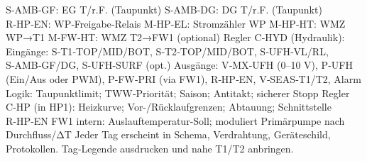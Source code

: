 \markdownRendererInterblockSeparator
{}\markdownRendererUlBeginTight
\markdownRendererUlItem S‑AMB‑GF: EG T/r.F. (Taupunkt)\markdownRendererUlItemEnd 
\markdownRendererUlItem S‑AMB‑DG: DG T/r.F. (Taupunkt)\markdownRendererUlItemEnd 
\markdownRendererUlEndTight \markdownRendererInterblockSeparator
{}
\markdownRendererSectionEnd \markdownRendererSectionBegin
{}\markdownRendererInterblockSeparator
{}\markdownRendererUlBeginTight
\markdownRendererUlItem R‑HP‑EN: WP‑Freigabe‑Relais\markdownRendererUlItemEnd 
\markdownRendererUlItem M‑HP‑EL: Stromzähler WP\markdownRendererUlItemEnd 
\markdownRendererUlItem M‑HP‑HT: WMZ WP→T1\markdownRendererUlItemEnd 
\markdownRendererUlItem M‑FW‑HT: WMZ T2→FW1 (optional)\markdownRendererUlItemEnd 
\markdownRendererUlEndTight \markdownRendererInterblockSeparator
{}
\markdownRendererSectionEnd \markdownRendererSectionBegin
{}\markdownRendererInterblockSeparator
{}\markdownRendererUlBeginTight
\markdownRendererUlItem Regler C‑HYD (Hydraulik):\markdownRendererUlItemEnd 
\markdownRendererUlItem Eingänge: S‑T1‑TOP/MID/BOT, S‑T2‑TOP/MID/BOT, S‑UFH‑VL/RL, S‑AMB‑GF/DG, S‑UFH‑SURF (opt.)\markdownRendererUlItemEnd 
\markdownRendererUlItem Ausgänge: V‑MX‑UFH (0–10 V), P‑UFH (Ein/Aus oder PWM), P‑FW‑PRI (via FW1), R‑HP‑EN, V‑SEAS‑T1/T2, Alarm\markdownRendererUlItemEnd 
\markdownRendererUlItem Logik: Taupunktlimit; TWW‑Priorität; Saison; Antitakt; sicherer Stopp\markdownRendererUlItemEnd 
\markdownRendererUlItem Regler C‑HP (in HP1):\markdownRendererUlItemEnd 
\markdownRendererUlItem Heizkurve; Vor-/Rücklaufgrenzen; Abtauung; Schnittstelle R‑HP‑EN\markdownRendererUlItemEnd 
\markdownRendererUlItem FW1 intern:\markdownRendererUlItemEnd 
\markdownRendererUlItem Auslauftemperatur‑Soll; moduliert Primärpumpe nach Durchfluss/ΔT\markdownRendererUlItemEnd 
\markdownRendererUlEndTight \markdownRendererInterblockSeparator
{}
\markdownRendererSectionEnd \markdownRendererSectionBegin
{}\markdownRendererInterblockSeparator
{}\markdownRendererUlBeginTight
\markdownRendererUlItem Jeder Tag erscheint in Schema, Verdrahtung, Geräteschild, Protokollen.\markdownRendererUlItemEnd 
\markdownRendererUlItem Tag‑Legende ausdrucken und nahe T1/T2 anbringen.\markdownRendererUlItemEnd 
\markdownRendererUlEndTight 
\markdownRendererSectionEnd 
\markdownRendererSectionEnd \markdownRendererDocumentEnd